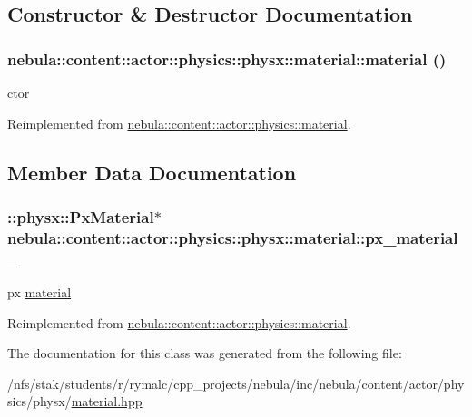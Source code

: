 \subsection{Constructor \& Destructor Documentation}
\hypertarget{classnebula_1_1content_1_1actor_1_1physics_1_1physx_1_1material_afa246384bd44c571e4ca83bef401e818}{
\subsubsection[{material}]{\setlength{\rightskip}{0pt plus 5cm}nebula::content::actor::physics::physx::material::material ()}}
\label{classnebula_1_1content_1_1actor_1_1physics_1_1physx_1_1material_afa246384bd44c571e4ca83bef401e818}


ctor 

Reimplemented from \hyperlink{classnebula_1_1content_1_1actor_1_1physics_1_1material_a2803be8bf8cae893ae68a0f84b6ec3b2}{nebula::content::actor::physics::material}.

\subsection{Member Data Documentation}
\hypertarget{classnebula_1_1content_1_1actor_1_1physics_1_1physx_1_1material_a7d95e2716e4cea5f6fcdd0bc2d82ff62}{
\subsubsection[{px\_\-material\_\-}]{\setlength{\rightskip}{0pt plus 5cm}::physx::PxMaterial$\ast$ {\bf nebula::content::actor::physics::physx::material::px\_\-material\_\-}}}
\label{classnebula_1_1content_1_1actor_1_1physics_1_1physx_1_1material_a7d95e2716e4cea5f6fcdd0bc2d82ff62}


px \hyperlink{classnebula_1_1content_1_1actor_1_1physics_1_1physx_1_1material}{material} 

Reimplemented from \hyperlink{classnebula_1_1content_1_1actor_1_1physics_1_1material_a7b9868ba375cb4abac9c9217f69e62ee}{nebula::content::actor::physics::material}.

The documentation for this class was generated from the following file:\begin{DoxyCompactItemize}
\item 
/nfs/stak/students/r/rymalc/cpp\_\-projects/nebula/inc/nebula/content/actor/physics/physx/\hyperlink{physics_2physx_2material_8hpp}{material.hpp}\end{DoxyCompactItemize}
